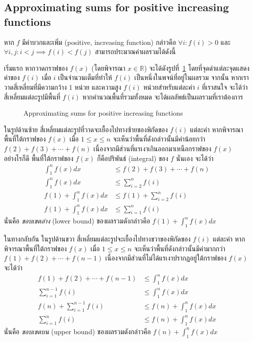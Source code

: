 \subsection{Approximating sums for positive increasing functions}

หาก $f$ มีค่าบวกและเพิ่ม (positive, increasing function) กล่าวคือ $\forall i: f(i)>0$ และ $\forall i,j: i<j \implies f(i)<f(j)$ สามารถประมาณค่าผลรวมได้ดังนี้

เริ่มแรก หากวาดกราฟของ $f(x)$ (โดยพิจารณา $x\in\mathbb{R}$) จะได้ดังรูปที่~\ref{fig:sums-approx-pos-inc} โดยที่จุดดำแต่ละจุดแสดงค่าของ $f(i)$ เมื่อ $i$ เป็นจำนวนเต็มที่ทำให้ $f(i)$ เป็นหนึ่งในพจน์ที่อยู่ในผลรวม \enskip จากนั้น หากเราวาดสี่เหลี่ยมที่มีความกว้าง 1 หน่วย และความสูง $f(i)$ หน่วยสำหรับแต่ละค่า $i$ ที่เราสนใจ จะได้ว่า สี่เหลี่ยมแต่ละรูปมีพื้นที่ $f(i)$ \enskip หากคำนวณพื้นที่รวมทั้งหมด จะได้ผลลัพธ์เป็นผลรวมที่เราต้องการ
%
\begin{figure}
\begin{center}
%
\end{center}
\caption{Approximating sums for positive increasing functions}
\label{fig:sums-approx-pos-inc}
\end{figure}
%
ในรูปด้านซ้าย สี่เหลี่ยมแต่ละรูปที่วาดจะเยื้องไปทางซ้ายของพิกัดของ $f(i)$ แต่ละค่า \enskip หากพิจารณาพื้นที่ใต้กราฟของ $f(x)$ เมื่อ $1\leq x\leq n$ จะเห็นว่าพื้นที่ดังกล่าวนั้นมีค่าน้อยกว่า $f(2)+f(3)+\cdots+f(n)$ เนื่องจากมีส่วนที่แรเงาเกินออกมาเหนือกราฟของ $f(x)$ \enskip อย่างไรก็ดี พื้นที่ใต้กราฟของ $f(x)$ ก็คือปริพันธ์ (integral) ของ $f$ นั่นเอง \enskip จะได้ว่า
\begin{align*}
\int_1^n{f(x)dx} &\leq f(2)+f(3)+\cdots+f(n) \\
\int_1^n{f(x)dx} &\leq \sum_{i=2}^n{f(i)} \\
f(1)+\int_1^n{f(x)dx} &\leq f(1)+\sum_{i=2}^n{f(i)} \\
f(1)+\int_1^n{f(x)dx} &\leq \sum_{i=1}^n{f(i)}
\end{align*}
นั่นคือ \emph{ขอบเขตล่าง} (lower bound) ของผลรวมดังกล่าวคือ $f(1)+\int_1^n{f(x)dx}$

ในทางกลับกัน ในรูปด้านขวา สี่เหลี่ยมแต่ละรูปจะเยื้องไปทางขวาของพิกัดของ $f(i)$ แต่ละค่า \enskip หากพิจารณาพื้นที่ใต้กราฟของ $f(x)$ เมื่อ $1\leq x\leq n$ จะเห็นว่าพื้นที่ดังกล่าวนั้นมีค่ามากกว่า $f(1)+f(2)+\cdots+f(n-1)$ เนื่องจากมีส่วนที่ไม่ได้แรเงาปรากฏอยู่ใต้กราฟของ $f(x)$ \enskip จะได้ว่า
\begin{align*}
f(1)+f(2)+\cdots+f(n-1) &\leq \int_1^n{f(x)dx} \\
\sum_{i=1}^{n-1}{f(i)} &\leq \int_1^n{f(x)dx} \\
f(n)+\sum_{i=1}^{n-1}{f(i)} &\leq f(n)+\int_1^n{f(x)dx} \\
\sum_{i=1}^{n}{f(i)} &\leq f(n)+\int_1^n{f(x)dx}
\end{align*}
นั่นคือ \emph{ขอบเขตบน} (upper bound) ของผลรวมดังกล่าวคือ $f(n)+\int_1^n{f(x)dx}$

